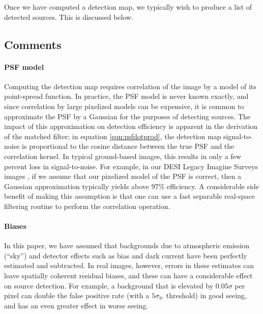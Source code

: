 \documentclass[11pt,letterpaper,linenumbers]{aastex63}
\newcommand{\psf}{\psi}
\newcommand{\sigd}{\sigma_{\mbox{\rmfamily\tiny D}}}
\begin{document}
Once we have computed a detection map, we typically wish to produce a
list of detected sources.  This is discussed below.


\subsection{Comments}

\paragraph{PSF model}
Computing the detection map requires correlation of the image by a
model of its point-spread function.  In practice, the PSF model is
never known exactly, and since correlation by large pixelized models
can be expensive, it is common to approximate the PSF by a Gaussian
for the purposes of detecting sources.  The impact of this
approximation on detection efficiency is apparent in the derivation of
the matched filter; in equation \ref{eqn:psfdotprod}, the detection
map signal-to-noise is proportional to the cosine distance between the
true PSF and the correlation kernel.  In typical ground-based images,
this results in only a few percent loss in signal-to-noise.  For
example, in our DESI Legacy Imagine Surveys images \citep{lsoverview},
if we assume that our pixelized model of the PSF is correct, then a
Gaussian approximation typically yields above $97\%$ efficiency.  A
considerable side benefit of making this assumption is that one can
use a fast separable real-space filtering routine to perform the
correlation operation.

\paragraph{Biases}
In this paper, we have assumed that backgrounds due to atmospheric
emission (``sky'') and detector effects such as bias and dark current
have been perfectly estimated and subtracted.  In real images,
however, errors in these estimates can leave spatially coherent
residual biases, and these can have a considerable effect on source
detection.  For example, a background that is elevated by $0.05
\sigma$ per pixel can double the false positive rate (with a
$5\sigd$ threshold) in good seeing, and has an even greater effect
in worse seeing.

\end{document}
